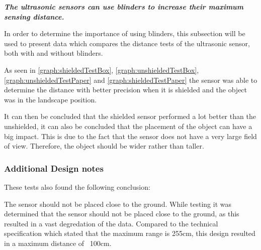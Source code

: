 \textit{\textbf{The ultrasonic sensors can use blinders to increase their
maximum sensing distance.}}\nl

In order to determine the importance of using blinders, this subsection will be
used to present data which compares the distance tests of the ultrasonic sensor,
both with and without blinders.






As seen in \autoref{graph:shieldedTestBox}, \autoref{graph:unshieldedTestBox},
\autoref{graph:unshieldedTestPaper} and \autoref{graph:shieldedTestPaper} the
sensor was able to determine the distance with better precision when it is
shielded and the object was in the landscape position. \nl

It can then be concluded that the shielded sensor performed a lot better than
the unshielded, it can also be concluded that the placement of the object can
have a big impact. This is due to the fact that the sensor does not have a very
large field of view. Therefore, the object should be wider rather than taller. 

\subsubsection{Additional Design notes}
These tests also found the following conclusion:\nl

The sensor should not be placed close to the ground. While testing it was
determined that the sensor should not be placed close to the ground, as this
resulted in a vast degredation of the data. Compared to the technical
specification which stated that the maximum range is 255cm, this design resulted
in a maximum distance of ~100cm.\nl


